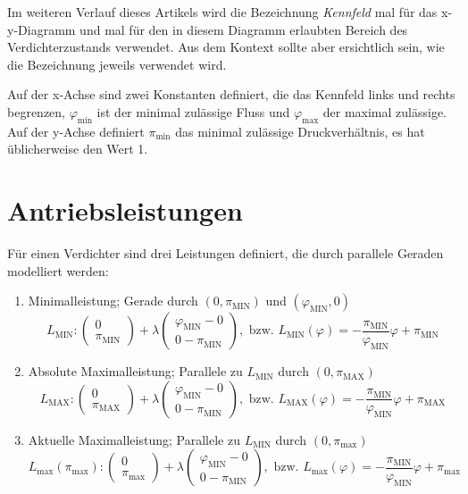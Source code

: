 \documentclass{article}
\newcommand{\piMIN}{\pi_\text{MIN}}
\newcommand{\piMAX}{\pi_\text{MAX}}
\newcommand{\pimin}{\pi_\text{min}}
\newcommand{\pimax}{\pi_\text{max}}
\newcommand{\phiMIN}{\varphi_\text{MIN}}
\newcommand{\phimax}{\varphi_\text{max}}
\newcommand{\LMIN}{L_\text{MIN}}
\newcommand{\Lmax}{L_\text{max}}
\begin{document}
Im weiteren Verlauf dieses Artikels wird die Bezeichnung {\em Kennfeld} mal für das x-y-Diagramm und mal für den in diesem Diagramm erlaubten Bereich des Verdichterzustands verwendet. Aus dem Kontext sollte aber ersichtlich sein, wie die Bezeichnung jeweils verwendet wird.

Auf der x-Achse sind zwei Konstanten definiert, die das Kennfeld links und rechts begrenzen, 
$\varphi_\text{min}$ ist der minimal zulässige Fluss und $\phimax$ der maximal zulässige. Auf der y-Achse definiert $\pimin$ das minimal zulässige Druckverhältnis, es hat üblicherweise den Wert 1.

\section{Antriebsleistungen}

Für einen Verdichter sind drei Leistungen definiert, die durch parallele Geraden modelliert werden:

\begin{enumerate}

\item Minimalleistung; Gerade durch $(0,\piMIN)$ und $(\phiMIN,0)$
$$L_\text{MIN}: \begin{pmatrix} 0 \\ \piMIN \end{pmatrix} + \lambda \begin{pmatrix} \phiMIN - 0 \\ 0 - \piMIN \end{pmatrix},\text{ bzw. } \LMIN(\varphi)=-\frac{\piMIN}{\phiMIN}\varphi+\piMIN$$

\item Absolute Maximalleistung; Parallele zu $L_\text{MIN}$ durch $(0,\pi_{\text{MAX}})$
$$L_\text{MAX}: \begin{pmatrix} 0 \\ \pi_{\text{MAX}} \end{pmatrix} + \lambda \begin{pmatrix} \phiMIN - 0 \\ 0 - \piMIN \end{pmatrix},\text{ bzw. } L_{\text{MAX}}(\varphi)=-\frac{\piMIN}{\phiMIN}\varphi+\piMAX$$

\item Aktuelle Maximalleistung; Parallele zu $L_\text{MIN}$ durch $(0,\pimax)$
$$\Lmax(\pimax): \begin{pmatrix} 0 \\ \pimax \end{pmatrix} + \lambda \begin{pmatrix} \phiMIN - 0 \\ 0 - \piMIN \end{pmatrix},\text{ bzw. } L_{\text{max}}(\varphi)=-\frac{\piMIN}{\phiMIN}\varphi+\pimax$$

\end{enumerate}
\end{document}
